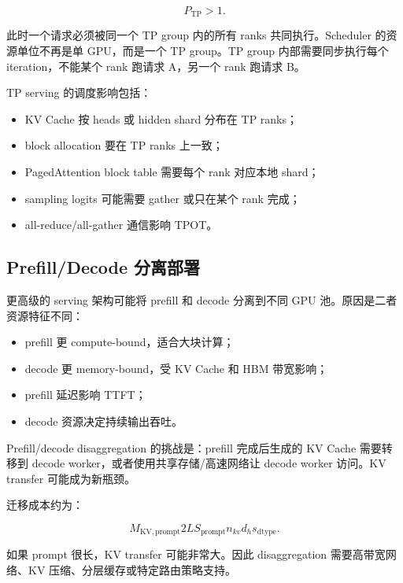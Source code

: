 \[
P_{\mathrm{TP}}>1.
\]

此时一个请求必须被同一个 TP group 内的所有 ranks 共同执行。Scheduler 的资源单位不再是单 GPU，而是一个 TP group。TP group 内部需要同步执行每个 iteration，不能某个 rank 跑请求 A，另一个 rank 跑请求 B。

TP serving 的调度影响包括：

\begin{itemize}
\item KV Cache 按 heads 或 hidden shard 分布在 TP ranks；
\item block allocation 要在 TP ranks 上一致；
\item PagedAttention block table 需要每个 rank 对应本地 shard；
\item sampling logits 可能需要 gather 或只在某个 rank 完成；
\item all-reduce/all-gather 通信影响 TPOT。
\end{itemize}

\subsection{Prefill/Decode 分离部署}
\label{subsec:prefill-decode-disaggregation}

更高级的 serving 架构可能将 prefill 和 decode 分离到不同 GPU 池。原因是二者资源特征不同：

\begin{itemize}
\item prefill 更 compute-bound，适合大块计算；
\item decode 更 memory-bound，受 KV Cache 和 HBM 带宽影响；
\item prefill 延迟影响 TTFT；
\item decode 资源决定持续输出吞吐。
\end{itemize}

Prefill/decode disaggregation 的挑战是：prefill 完成后生成的 KV Cache 需要转移到 decode worker，或者使用共享存储/高速网络让 decode worker 访问。KV transfer 可能成为新瓶颈。

迁移成本约为：

\[
M_{\mathrm{KV,prompt}}
2L S_{\mathrm{prompt}} n_{kv}d_hs_{\mathrm{dtype}}.
\]

如果 prompt 很长，KV transfer 可能非常大。因此 disaggregation 需要高带宽网络、KV 压缩、分层缓存或特定路由策略支持。

